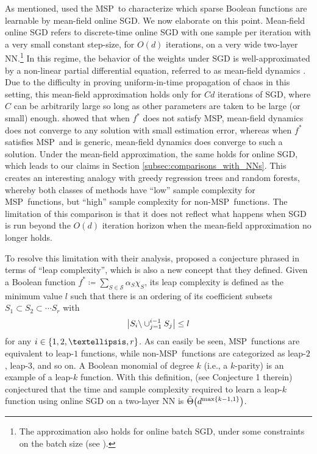 \documentclass[11pt]{article}
\DeclarePairedDelimiter{\braces}{\lbrace}{\rbrace}
\DeclarePairedDelimiter{\paren}{(}{)}
\DeclarePairedDelimiter{\abs}{|}{|}
\newcommand{\nfeats}{d}
\newcommand{\MSP}{\textsf{MSP}}
\newcommand{\monomial}{\chi}
\newcommand{\fcoefs}{\mathcal{S}}
\begin{document}
As mentioned, \cite{abbe2022merged} used the \MSP~to characterize which sparse Boolean functions are learnable by mean-field online SGD.
We now elaborate on this point.
Mean-field online SGD refers to discrete-time online SGD with one sample per iteration with a very small constant step-size, for $O(d)$ iterations, on a very wide two-layer NN.\footnote{The approximation also holds for online batch SGD, under some constraints on the batch size (see \cite{abbe2022merged}).}
In this regime, the behavior of the weights under SGD is well-approximated by a non-linear partial differential equation, referred to as mean-field dynamics \citep{mei2018mean}.
Due to the difficulty in proving uniform-in-time propagation of chaos in this setting, this mean-field approximation holds only for $Cd$ iterations of SGD, where $C$ can be arbitrarily large so long as other parameters are taken to be large (or small) enough.
\cite{abbe2022merged} showed that when $f^*$ does not satisfy \MSP, mean-field dynamics does not converge to any solution with small estimation error, whereas when $f^*$ satisfies \MSP~and is generic, mean-field dynamics does converge to such a solution.
Under the mean-field approximation, the same holds for online SGD, which leads to our claims in Section \ref{subsec:comparisons_with_NNs}.
This creates an interesting analogy with greedy regression trees and random forests, whereby both classes of methods have ``low'' sample complexity for \MSP~functions, but ``high'' sample complexity for non-\MSP~functions.
The limitation of this comparison is that it does not reflect what happens when SGD is run beyond the $O(d)$ iteration horizon when the mean-field approximation no longer holds.

To resolve this limitation with their analysis, \cite{abbe2023sgd} proposed a conjecture phrased in terms of ``leap complexity'', which is also a new concept that they defined.
Given a Boolean function $f^* \coloneqq \sum_{S \in \fcoefs}\alpha_S\monomial_S$, its leap complexity is defined as the minimum value $l$ such that there is an ordering of its coefficient subsets $S_1 \subset S_2 \subset \cdots S_r$ with
\begin{equation}
    \abs*{S_i\backslash\cup_{j =1}^{i-1} S_j} \leq l
\end{equation}
for any $i \in \braces{1,2,\ldots,r}$.
As can easily be seen, \MSP~functions are equivalent to leap-$1$ functions, while non-\MSP~functions are categorized as leap-$2$, leap-$3$, and so on.
A Boolean monomial of degree $k$ (i.e., a $k$-parity) is an example of a leap-$k$ function.
With this definition, \cite{abbe2023sgd} (see Conjecture 1 therein) conjectured that the time and sample complexity required to learn a leap-$k$ function using online SGD on a two-layer NN is $\tilde{\Theta}\paren*{\nfeats^{\max\braces*{k-1,1}}}$.
\end{document}
